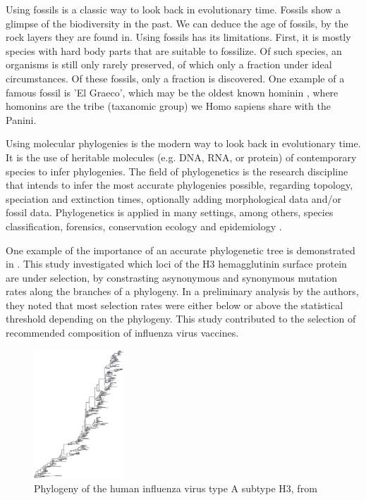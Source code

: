 Using fossils is a classic way to look back in evolutionary time.
Fossils show a glimpse of the biodiversity in the past.
We can deduce the age of fossils, by the rock layers they are found in.
Using fossils has its limitations. First, it is mostly species with hard body
parts that are suitable to fossilize. Of such species, an organisms is still 
only rarely preserved, of which only a fraction under ideal circumstances. Of 
these fossils, only a fraction is discovered.
One example of a famous fossil is 'El Graeco', 
which may be the oldest known hominin \cite{fuss2017potential}, where
homonins are the tribe (taxanomic group) we Homo sapiens share with the Panini.

Using molecular phylogenies is the modern way to look back in evolutionary time.
It is the use of heritable molecules (e.g. DNA, RNA, or protein)  
of contemporary species to infer phylogenies. 
The field of phylogenetics is the research discipline that
intends to infer the most accurate phylogenies possible, 
regarding topology, speciation and extinction times,
optionally adding morphological data and/or fossil data.
Phylogenetics is applied in many settings, among
others, species classification,
forensics, conservation ecology
and epidemiology \cite{lam2010use}.

One example of the importance of an accurate phylogenetic tree 
is demonstrated in \cite{bush1999positive}. This study
investigated which loci of the H3 hemagglutinin surface protein
are under selection, by constrasting asynonymous and synonymous
mutation rates along the branches of a phylogeny. 
In a preliminary analysis by the authors, they noted that
most selection rates were either below or above the 
statistical threshold depending on the phylogeny.
This study contributed to the selection of recommended 
composition of influenza virus vaccines.

\begin{figure}[H]
  \includegraphics[width=0.3\textwidth]{bush_et_al_1999}
  \caption{
    Phylogeny of the human influenza virus type A subtype H3,
    from \cite{bush1999positive}
  }
  \label{fig:bush_et_al_1999}
\end{figure}

